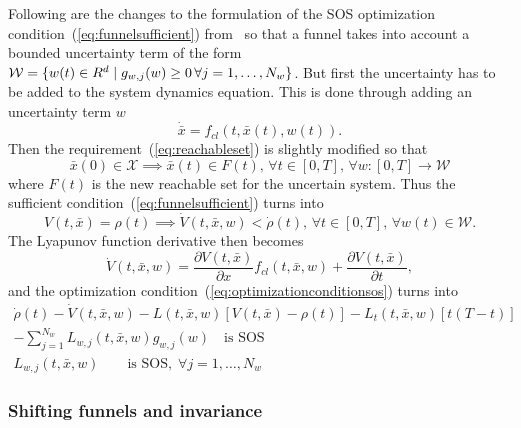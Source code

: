 Following are the changes to the formulation of the \ac{SOS} optimization
condition~(\ref{eq:funnelsufficient})
from~\cite{majumdarFunnelLibrariesRealtime2017} so that a funnel takes into
account a bounded uncertainty term of the form \(\mathcal{W} = \lbrace w(t) \in
  R^d \mid g_{w,j}(w) \geq 0\, \forall j = 1,\ldots,N_w\rbrace\). But first the
uncertainty has to be added to the system dynamics equation. This is done
through adding an uncertainty term \(w\)
\begin{equation}
  \dot{\bar{x}} = f_{cl}(t, \bar{x}(t), w(t)).
\end{equation}
Then the requirement~(\ref{eq:reachableset}) is slightly modified so that
\begin{equation}
  \label{eq:uncertain-reachableset}
  \bar{x}(0) \in \mathcal{X} \implies \bar{x}(t) \in F(t),\, \forall t \in
  [0,T], \, \forall w \colon [0,T] \rightarrow \mathcal{W}
\end{equation} 
where \(F(t)\) is the new reachable set for the uncertain system. Thus the
sufficient condition~(\ref{eq:funnelsufficient}) turns into
\begin{equation}
  \label{eq:funneluncertain-sufficient}
  V(t,\bar{x}) = \rho(t) \implies \dot{V}(t,\bar{x},w) < \dot{\rho}(t), \, \forall t \in [0,T], \, \forall w(t) \in \mathcal{W}.
\end{equation}
The Lyapunov function derivative then becomes
\begin{equation}
  \dot{V}(t,\bar{x}, w) = \frac{\partial V(t,\bar{x})}{\partial x} f_{cl}(t,\bar{x},w) + \frac{\partial V(t,\bar{x})}{\partial t},
\end{equation}
and the optimization condition~(\ref{eq:optimizationconditionsos}) turns into
\begin{align}
  \label{eq:optimizationconditionuncertain}
  \dot{\rho}(t) - \dot{V}(t,\bar{x},w) - L(t,\bar{x},w) \left[ V(t,\bar{x}) - \rho(t) \right] - L_{t}(t,\bar{x},w)\left[ t\left( T - t \right) \right]  & \nonumber \\
  - \sum_{j=1}^{N_{w}} L_{w,j}(t,\bar{x},w)g_{w,j}(w) \quad \text{is SOS} &  \\
  L_{w,j}(t,\bar{x},w) \qquad \text{is SOS}, \; \forall j = 1,\ldots,N_w \nonumber
\end{align}

\subsubsection{Shifting funnels and invariance}

